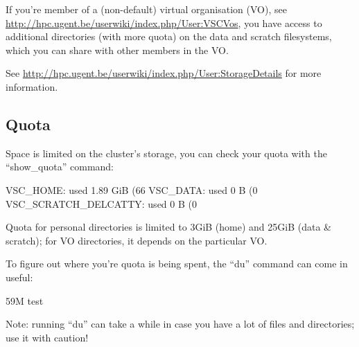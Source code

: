If you're member of a (non-default) virtual organisation (VO), see
\url{http://hpc.ugent.be/userwiki/index.php/User:VSCVos}, you have access to
additional directories (with more quota) on the data and scratch filesystems,
which you can share with other members in the VO.

See \url{http://hpc.ugent.be/userwiki/index.php/User:StorageDetails} for more
information.

\subsection{Quota}

Space is limited on the cluster's storage, you can check your quota with the
``show\_quota'' command:

\begin{prompt}
VSC\_HOME: used 1.89 GiB (66%
VSC\_DATA: used 0 B (0%
VSC\_SCRATCH\_DELCATTY: used 0 B (0%
\end{prompt}

Quota for personal directories is limited to 3GiB (home) and 25GiB (data \&
scratch); for VO directories, it depends on the particular VO.

To figure out where you're quota is being spent, the ``du'' command can come in
useful:

\begin{prompt}
59M   test
\end{prompt}

Note: running ``du'' can take a while in case you have a lot of files and
directories; use it with caution!
